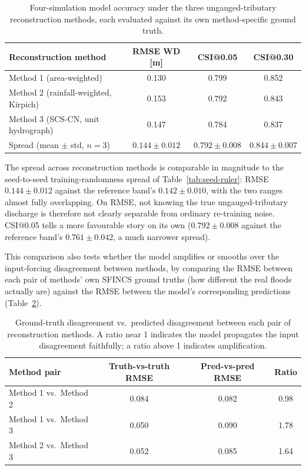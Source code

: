 \documentclass[12pt,a4paper]{report}
\begin{document}
{\begin{table}[H]
  \centering
  \caption{Four-simulation model accuracy under the three ungauged-tributary
    reconstruction methods, each evaluated against its own method-specific ground
    truth.}
  \label{tab:bcmethod-accuracy}
  \begin{tabular}{lccc}
    \toprule
    Reconstruction method & RMSE WD [m] & CSI@0.05 & CSI@0.30 \\
    \midrule
    Method 1 (area-weighted)                    & 0.130 & 0.799 & 0.852 \\
    Method 2 (rainfall-weighted, Kirpich)  & 0.153 & 0.792 & 0.843 \\
    Method 3 (SCS-CN, unit hydrograph)     & 0.147 & 0.784 & 0.837 \\
    \midrule
    Spread (mean $\pm$ std, $n=3$)          & $0.144 \pm 0.012$ & $0.792 \pm 0.008$ & $0.844 \pm 0.007$ \\
    \bottomrule
  \end{tabular}
\end{table}
 
The spread across reconstruction methods is comparable in magnitude to the
seed-to-seed training-randomness spread of Table~\ref{tab:seed-ruler}: RMSE
$0.144 \pm 0.012$ against the reference band's
$0.142 \pm 0.010$, with the two
ranges almost fully overlapping. On RMSE, not knowing the true ungauged-tributary
discharge is therefore not clearly separable from ordinary re-training noise. CSI@0.05
tells a more favourable story on its own ($0.792 \pm 0.008$ against the reference band's
$0.761 \pm 0.042$, a much narrower spread).
 
This comparison also tests whether the model amplifies or smooths over the
input-forcing disagreement between methods, by comparing the RMSE between each pair of
methods' own SFINCS ground truths (how different the real floods actually are) against
the RMSE between the model's corresponding predictions (Table~\ref{tab:bcmethod-amplification}).
 
\begin{table}[H]
  \centering
  \caption{Ground-truth disagreement vs.\ predicted disagreement between each pair of
    reconstruction methods. A ratio near 1 indicates the model propagates the input
    disagreement faithfully; a ratio above 1 indicates amplification.}
  \label{tab:bcmethod-amplification}
  \begin{tabular}{lccc}
    \toprule
    Method pair & Truth-vs-truth RMSE & Pred-vs-pred RMSE & Ratio \\
    \midrule
    Method 1 vs.\ Method 2 & 0.084 & 0.082 & 0.98 \\
    Method 1 vs.\ Method 3 & 0.050 & 0.090 & 1.78 \\
    Method 2 vs.\ Method 3 & 0.052 & 0.085 & 1.64 \\
    \bottomrule
  \end{tabular}
\end{table}
 
}
\end{document}
